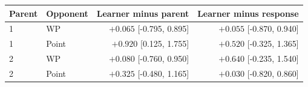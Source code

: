 \begin{tabular}{llrr}
\toprule
Parent & Opponent & Learner minus parent & Learner minus response \\
\midrule
1 & WP & $+0.065$ [-0.795, 0.895] & $+0.055$ [-0.870, 0.940] \\
1 & Point & $+0.920$ [0.125, 1.755] & $+0.520$ [-0.325, 1.365] \\
2 & WP & $+0.080$ [-0.760, 0.950] & $+0.640$ [-0.235, 1.540] \\
2 & Point & $+0.325$ [-0.480, 1.165] & $+0.030$ [-0.820, 0.860] \\
\bottomrule
\end{tabular}
